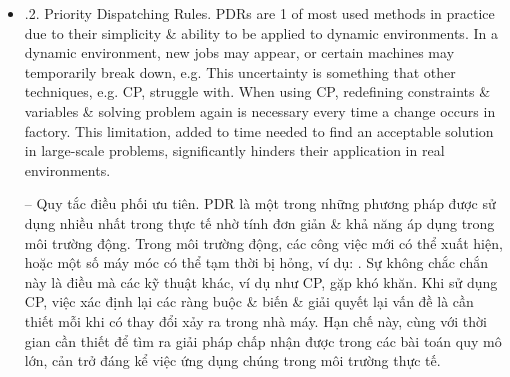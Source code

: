 \documentclass{article}
\begin{document}
\begin{itemize}
\begin{itemize}
\begin{itemize}
            {\bf Using CP-SAT optimizer from OR-Tools in JobShopLib.} {\tt JobShopLib} provides {\tt ORToolsSolver} class, which encodes problem in previously presented from transparently to user:
            \begin{Verbatim}[numbers=left,xleftmargin=5mm]
# use CP-SAT optimizer from OR-Tools in JobShopLib
from job_shop_lib.constraint_programming import ORToolsSolver

cp_sat_optimizer = ORToolsSolver()
optimal_schedule = cp_sat_optimizer(instance)
            \end{Verbatim}
            \item {.2. Priority Dispatching Rules.} PDRs are 1 of most used methods in practice due to their simplicity \& ability to be applied to dynamic environments. In a dynamic environment, new jobs may appear, or certain machines may temporarily break down, e.g. This uncertainty is something that other techniques, e.g. CP, struggle with. When using CP, redefining constraints \& variables \& solving problem again is necessary every time a change occurs in factory. This limitation, added to time needed to find an acceptable solution in large-scale problems, significantly hinders their application in real environments.

            -- {\sf Quy tắc điều phối ưu tiên.} PDR là một trong những phương pháp được sử dụng nhiều nhất trong thực tế nhờ tính đơn giản \& khả năng áp dụng trong môi trường động. Trong môi trường động, các công việc mới có thể xuất hiện, hoặc một số máy móc có thể tạm thời bị hỏng, ví dụ: . Sự không chắc chắn này là điều mà các kỹ thuật khác, ví dụ như CP, gặp khó khăn. Khi sử dụng CP, việc xác định lại các ràng buộc \& biến \& giải quyết lại vấn đề là cần thiết mỗi khi có thay đổi xảy ra trong nhà máy. Hạn chế này, cùng với thời gian cần thiết để tìm ra giải pháp chấp nhận được trong các bài toán quy mô lớn, cản trở đáng kể việc ứng dụng chúng trong môi trường thực tế.


\end{itemize}
\end{itemize}
\end{itemize}
\end{document}
